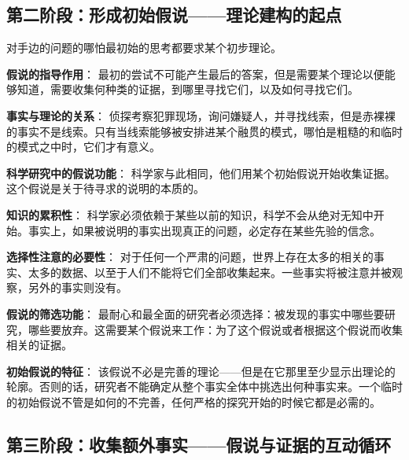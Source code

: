 \subsection{第二阶段：形成初始假说——理论建构的起点}

\begin{theorembox}[title=初始假说的认识论功能]
对手边的问题的哪怕最初始的思考都要求某个初步理论。

\textbf{假说的指导作用}：
最初的尝试不可能产生最后的答案，但是需要某个理论以便能够知道，需要收集何种类的证据，到哪里寻找它们，以及如何寻找它们。

\textbf{事实与理论的关系}：
侦探考察犯罪现场，询问嫌疑人，并寻找线索，但是赤裸裸的事实不是线索。只有当线索能够被安排进某个融贯的模式，哪怕是粗糙的和临时的模式之中时，它们才有意义。

\textbf{科学研究中的假说功能}：
科学家与此相同，他们用某个初始假说开始收集证据。这个假说是关于待寻求的说明的本质的。

\textbf{知识的累积性}：
科学家必须依赖于某些以前的知识，科学不会从绝对无知中开始。事实上，如果被说明的事实出现真正的问题，必定存在某些先验的信念。

\textbf{选择性注意的必要性}：
对于任何一个严肃的问题，世界上存在太多的相关的事实、太多的数据、以至于人们不能将它们全部收集起来。一些事实将被注意并被观察，另外的事实则没有。

\textbf{假说的筛选功能}：
最耐心和最全面的研究者必须选择：被发现的事实中哪些要研究，哪些要放弃。这需要某个假说来工作：为了这个假说或者根据这个假说而收集相关的证据。

\textbf{初始假说的特征}：
该假说不必是完善的理论——但是在它那里至少显示出理论的轮廓。否则的话，研究者不能确定从整个事实全体中挑选出何种事实来。一个临时的初始假说不管是如何的不完善，任何严格的探究开始的时候它都是必需的。
\end{theorembox}

\subsection{第三阶段：收集额外事实——假说与证据的互动循环}

